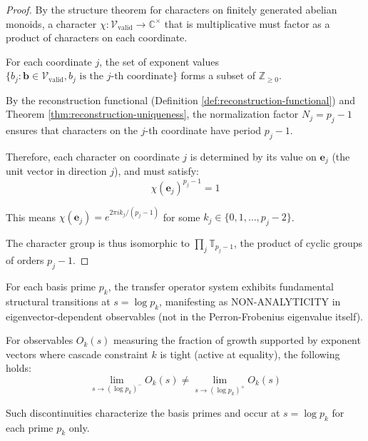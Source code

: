 \begin{proof}

By the structure theorem for characters on finitely generated abelian monoids, a character $\chi: \mathcal{V}_{\text{valid}} \to \mathbb{C}^\times$ that is multiplicative must factor as a product of characters on each coordinate.

For each coordinate $j$, the set of exponent values $\{b_j : \mathbf{b} \in \mathcal{V}_{\text{valid}}, b_j \text{ is the } j\text{-th coordinate}\}$ forms a subset of $\mathbb{Z}_{\geq 0}$.

By the reconstruction functional (Definition \ref{def:reconstruction-functional}) and Theorem \ref{thm:reconstruction-uniqueness}, the normalization factor $N_j = p_j - 1$ ensures that characters on the $j$-th coordinate have period $p_j - 1$.

Therefore, each character on coordinate $j$ is determined by its value on $\mathbf{e}_j$ (the unit vector in direction $j$), and must satisfy:
\begin{equation}
\chi(\mathbf{e}_j)^{p_j - 1} = 1
\end{equation}

This means $\chi(\mathbf{e}_j) = e^{2\pi i k_j / (p_j-1)}$ for some $k_j \in \{0, 1, \ldots, p_j-2\}$.

The character group is thus isomorphic to $\prod_j \mathbb{T}_{p_j-1}$, the product of cyclic groups of orders $p_j - 1$.

\end{proof}

\begin{lemma}
\label{lem:spectral-eigenvalue-transition}

For each basis prime $p_k$, the transfer operator system exhibits fundamental structural transitions at $s = \log p_k$, manifesting as NON-ANALYTICITY in eigenvector-dependent observables (not in the Perron-Frobenius eigenvalue itself).

For observables $O_k(s)$ measuring the fraction of growth supported by exponent vectors where cascade constraint $k$ is tight (active at equality), the following holds:
\begin{equation}
\lim_{s \to (\log p_k)^-} O_k(s) \neq \lim_{s \to (\log p_k)^+} O_k(s)
\end{equation}

Such discontinuities characterize the basis primes and occur at $s = \log p_k$ for each prime $p_k$ only.

\end{lemma}

